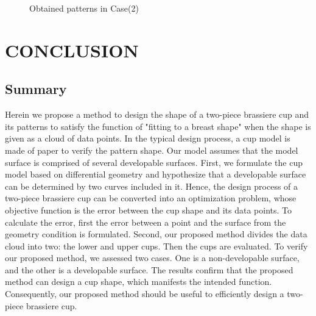 \documentclass[E]{scitrans}
\begin{document}
\begin{figure}[h!]
	\centering
	\hfil
	
	\caption{Obtained patterns in Case(2)}
	\label{fig:ObtainedSurfaceDS_Pat}
\end{figure}
\section*{CONCLUSION}
\subsection*{Summary}
Herein we propose a method to design the shape of a two-piece brassiere cup and its patterns to satisfy the function of "fitting to a breast shape" when the shape is given as a cloud of data points. In the typical design process, a cup model is made of paper to verify the pattern shape. Our model assumes that the model surface is comprised of several developable surfaces. First, we formulate the cup model based on differential geometry and hypothesize that a developable surface can be determined by two curves included in it. Hence, the design process of a two-piece brassiere cup can be converted into an optimization problem, whose objective function is the error between the cup shape and its data points. To calculate the error, first the error between a point and the surface from the geometry condition is formulated. Second, our proposed method divides the data cloud into two: the lower and upper cups. Then the cups are evaluated. To verify our proposed method, we assessed two cases. One is a non-developable surface, and the other is a developable surface. The results confirm that the proposed method can design a cup shape, which manifests the intended function. Consequently, our proposed method should be useful to efficiently design a two-piece brassiere cup. 
\end{document}
